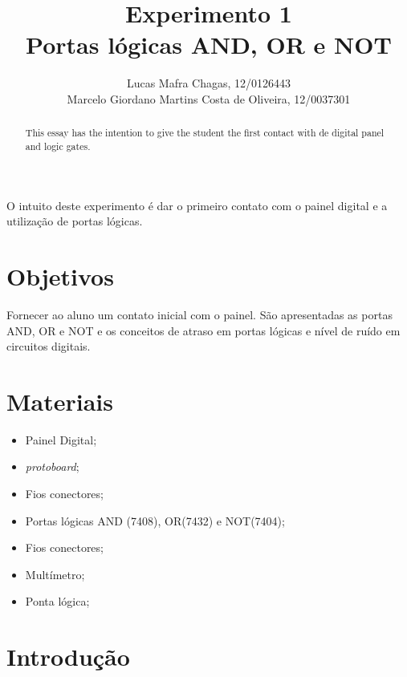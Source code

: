 \documentclass[12pt]{article}
\title{Experimento 1\\ 
Portas lógicas AND, OR e NOT}
\author{Lucas Mafra Chagas, 12/0126443\\
        Marcelo Giordano Martins Costa de Oliveira,  12/0037301\\
}
\begin{document}
 

\maketitle

 \begin{abstract}
   This essay has the intention to give the student the first contact with de digital panel and logic gates.
 \end{abstract}
     
 \begin{resumo} 
  O intuito deste experimento é dar o primeiro contato com o painel digital e a utilização de portas lógicas.
 \end{resumo}


\section{Objetivos}
\label{sec:Objetivos}

Fornecer ao aluno um contato inicial com o painel. São apresentadas as portas AND, OR e
NOT e os conceitos de atraso em portas lógicas e nível de ruído em circuitos digitais.

\section{Materiais} 
\label{sec:Materiais}

\begin{itemize}
    \item Painel Digital;
    
    \item \textit{protoboard};
    
    \item Fios conectores;
    
    \item Portas lógicas AND (7408), OR(7432) e NOT(7404);
    
    \item Fios conectores;
    
    \item Multímetro;
    
    \item Ponta lógica;
    
\end{itemize}


\section{Introdução}
\label{sec:Introducao}
\end{document}
